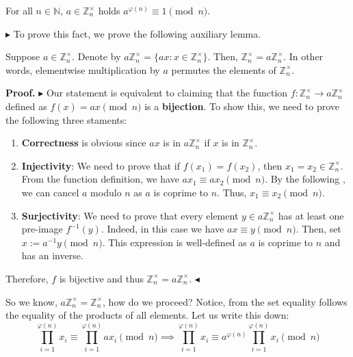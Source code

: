 \documentclass[../lecture-notes-148x210.tex]{subfiles}
\begin{document}
\begin{theorem} [Euler] \label{th:euler_theorem}
    For all $n \in \mathbb{N}$, $a \in \mathbb{Z}_n^{\times}$ 
    holds $a^{\varphi(n)} \equiv 1 \pmod{n}$.
\end{theorem}

$\blacktriangleright$ To prove this fact, we prove the following auxiliary lemma.

\begin{lemma}
    Suppose $a \in \mathbb{Z}_n^{\times}$. Denote by $a\mathbb{Z}_n^{\times} =
    \{ax: x \in \mathbb{Z}_n^{\times}\}$. Then, $\mathbb{Z}_n^{\times} =
    a\mathbb{Z}_n^{\times}$. In other words, elementwise multiplication by $a$
    permutes the elements of $\mathbb{Z}_n^{\times}$.
\end{lemma}

\textbf{Proof.} $\blacktriangleright$ Our statement is equivalent to claiming that the 
function $f: \mathbb{Z}_n^{\times} \to a\mathbb{Z}_n^{\times}$ defined 
as $f(x) = ax \pmod{n}$ is a \textbf{bijection}. To show this, we need to prove the following 
three staments:
\begin{enumerate}
    \item \textbf{Correctness} is obvious since $ax$ is in $a\mathbb{Z}_n^{\times}$ if $x$ is in $\mathbb{Z}_n^{\times}$.
    \item \textbf{Injectivity}: We need to prove that if $f(x_1)=f(x_2)$, 
    then $x_1=x_2 \in \mathbb{Z}_n^{\times}$. 
    From the function definition, we have $ax_1 \equiv ax_2 \pmod{n}$. By the following 
    , we can cancel $a$ modulo $n$ as $a$ is coprime to $n$. 
    Thus, $x_1 \equiv x_2 \pmod{n}$.
    \item \textbf{Surjectivity}: We need to prove that every element $y \in a\mathbb{Z}_n^{\times}$ has at least 
    one pre-image $f^{-1}(y)$. Indeed, in this case we have $ax \equiv y \pmod{n}$. Then, set $x := a^{-1}y \pmod {n}$. This 
    expression is well-defined as $a$ is coprime to $n$ and has an inverse.
\end{enumerate}

Therefore, $f$ is bijective and thus $\mathbb{Z}_n^{\times} = a\mathbb{Z}_n^{\times}$.
$\blacktriangleleft$

So we know, $a\mathbb{Z}_n^{\times} = \mathbb{Z}_n^{\times}$, how do we proceed? Notice, from the 
set equality follows the equality of the products of all elements. Let us write this down:
\begin{equation*}
    \prod_{i = 1}^{\varphi(n)} x_i \equiv \prod_{i = 1}^{\varphi(n)} a x_i \pmod{n} \implies \prod_{i = 1}^{\varphi(n)} x_i \equiv a^{\varphi(n)} \prod_{i = 1}^{\varphi(n)} x_i \pmod{n}
\end{equation*}    
    
\end{document}

